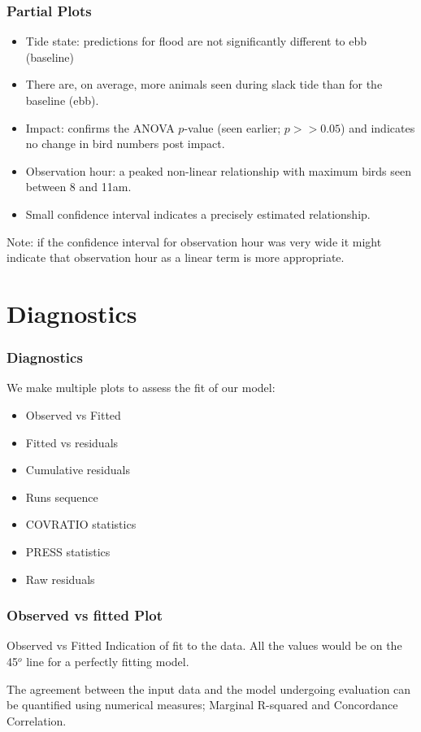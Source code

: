 \documentclass[11pt, a4paper]{article}
\begin{document}
\begin{frame}
\frametitle{Partial Plots}
\begin{itemize}
\item Tide state: predictions for flood are not significantly different to ebb (baseline)
\item There are, on average, more animals seen during slack tide than for the baseline (ebb). \pause
\item Impact: confirms the ANOVA $p$-value (seen earlier; $p>>0.05$) and indicates no change in bird numbers post impact.
\pause
\item Observation hour: a peaked non-linear relationship with maximum birds seen between 8 and 11am.
\item Small confidence interval indicates a precisely estimated relationship.
\end{itemize}
\pause
\bigskip
Note: if the confidence interval for observation hour was very wide it might indicate that observation hour as a linear term is more appropriate.
\end{frame}

\clearpage

\section{Diagnostics}

\begin{frame}[fragile]
\frametitle{Diagnostics}
We make multiple plots to assess the fit of our model:

\bigskip
\begin{itemize}
\item Observed vs Fitted
\item Fitted vs residuals
\item Cumulative residuals
\item Runs sequence
\item COVRATIO statistics
\item PRESS statistics
\item Raw residuals
\end{itemize}
\end{frame}

\begin{frame}[fragile]
\frametitle{Observed vs fitted Plot}

\begin{block}{Observed vs Fitted}
Indication of fit to the data.  All the values would be on the 45$^o$ line for a perfectly fitting model.    
\end{block}

The agreement between the input data and the model undergoing evaluation can be quantified using numerical measures; Marginal R-squared and Concordance Correlation. 
\end{frame}
\end{document}
